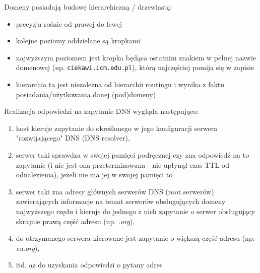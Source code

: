 Domeny posiadają budowę hierarchiczną / drzewiastą:
\begin{itemize}
	\item precyzja rośnie od prawej do lewej
	\item kolejne poziomy oddzielane są kropkami
	\item najwyższym poziomem jest kropka będąca ostatnim znakiem w pełnej nazwie domenowej (np. \texttt{ciekawi.icm.edu.pl\textbf{\color{red}{.}}}), którą najczęściej pomija się w zapisie
	\item hierarchia ta jest niezależna od hierarchii routingu i wynika z faktu posiadania/użytkowania danej (pod)domeny)
\end{itemize}
Realizacja odpowiedzi na zapytanie DNS wygląda następująco:
\begin{enumerate}
	\item host kieruje zapytanie do określonego w jego konfiguracji serwera "rozwijającego" DNS (DNS resolver),
	\item serwer taki sprawdza w swojej pamięci podręcznej czy zna odpowiedź na to zapytanie (i nie jest ona przeterminowana - nie upłynął czas TTL od odnalezienia), jeżeli nie ma jej w swojej pamięci to
	\item serwer taki zna adresy głównych serwerów DNS (root serwerów) zawierających informacje na temat serwerów obsługujących domeny najwyższego rzędu i kieruje do jednego z nich zapytanie o serwer obsługujący skrajnie prawą część adresu (np. \textit{.org}),
	\item do otrzymanego serwera kierowane jest zapytanie o większą część adresu (np. \textit{eu.org}),
	\item itd. aż do uzyskania odpowiedzi o pytany adres
\end{enumerate}


